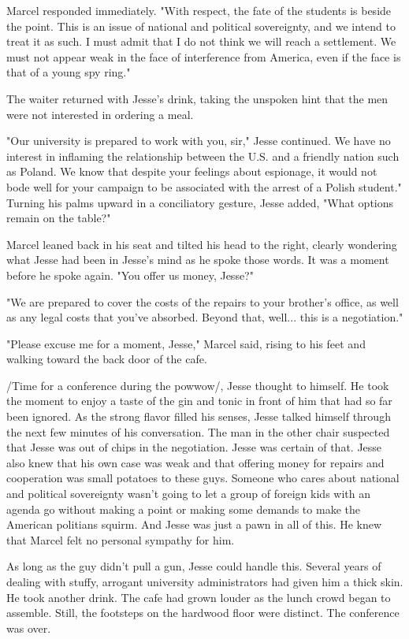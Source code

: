 Marcel responded immediately.  "With respect, the fate of the students is beside the point.  This is an issue of national and political sovereignty, and we intend to treat it as such.  I must admit that I do not think we will reach a settlement.  We must not appear weak in the face of interference from America, even if the face is that of a young spy ring."

The waiter returned with Jesse's drink, taking the unspoken hint that the men were not interested in ordering a meal.

"Our university is prepared to work with you, sir," Jesse continued.  We have no interest in inflaming the relationship between the U.S. and a friendly nation such as Poland.  We know that despite your feelings about espionage, it would not bode well for your campaign to be associated with the arrest of a Polish student."  Turning his palms upward in a conciliatory gesture, Jesse added, "What options remain on the table?"

Marcel leaned back in his seat and tilted his head to the right, clearly wondering what Jesse had been in Jesse's mind as he spoke those words.  It was a moment before he spoke again.  "You offer us money, Jesse?"

"We are prepared to cover the costs of the repairs to your brother's office, as well as any legal costs that you've absorbed.  Beyond that, well... this is a negotiation."

"Please excuse me for a moment, Jesse," Marcel said, rising to his feet and walking toward the back door of the cafe.

/Time for a conference during the powwow/, Jesse thought to himself.  He took the moment to enjoy a taste of the gin and tonic in front of him that had so far been ignored.  As the strong flavor filled his senses, Jesse talked himself through the next few minutes of his conversation.  The man in the other chair suspected that Jesse was out of chips in the negotiation.  Jesse was certain of that.  Jesse also knew that his own case was weak and that offering money for repairs and cooperation was small potatoes to these guys.  Someone who cares about national and political sovereignty wasn't going to let a group of foreign kids with an agenda go without making a point or making some demands to make the American politians squirm.  And Jesse was just a pawn in all of this.  He knew that Marcel felt no personal sympathy for him.

As long as the guy didn't pull a gun, Jesse could handle this.  Several years of dealing with stuffy, arrogant university administrators had given him a thick skin.  He took another drink.  The cafe had grown louder as the lunch crowd began to assemble.  Still, the footsteps on the hardwood floor were distinct.  The conference was over.


